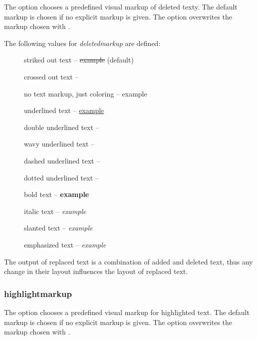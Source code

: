 
The  option chooses a predefined visual markup of deleted texty.
The default markup is chosen if no explicit markup is given.
The option  overwrites the markup chosen with .

The following values for \emph{deletedmarkup} are defined:

\begin{description}
	\item [] striked out text -- \sout{example} (default)
	\item [] crossed out text -- 
	\item [] no text markup, just coloring -- {\color{orange} example}
	\item [] underlined text -- \uline{example}
	\item [] double underlined text -- 
	\item [] wavy underlined text -- 
	\item [] dashed underlined text -- 
	\item [] dotted underlined text -- 
	\item [] bold text -- \textbf{example}
	\item [] italic text -- \textit{example}
	\item [] slanted text -- \textsl{example}
	\item [] emphasized text -- \emph{example}
\end{description}

The output of replaced text is a combination of added and deleted text, thus any change in their layout influences the layout of replaced text.



\subsubsection{highlightmarkup}


The  option chooses a predefined visual markup for highlighted text.
The default markup is chosen if no explicit markup is given.
The option  overwrites the markup chosen with .

